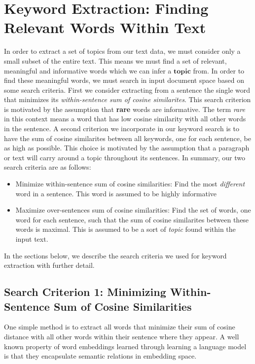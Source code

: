 \documentclass[12pt]{article}
\begin{document}
\section{Keyword Extraction: Finding Relevant Words Within Text}
In order to extract a set of topics from our text data, we must consider only a small subset of the entire text. This means we must find a set of relevant, meaningful and informative words which we can infer a $\textbf{topic}$ from. In order to find these meaningful words, we must search in input document space based on some search criteria. 
First we consider extracting from a sentence the single word that minimizes its \textit{within-sentence sum of cosine similarites}. This search criterion is motivated by the assumption that \textbf{rare} words are informative. The term \textit{rare} in this context means a word that has low cosine similarity with all other words in the sentence. A second criterion we incorporate in our keyword search is to have the sum of cosine similarites between all keywords, one for each sentence, be as high as possible. This choice is motivated by the assumption that a paragraph or text will carry around a topic throughout its sentences. In summary, our two search criteria are as follows:

\begin{itemize}
  \item Minimize within-sentence sum of cosine similarities: Find the most \textit{different} word in a sentence. This word is assumed to be highly informative
  \item Maximize over-sentences sum of cosine similarities: Find the set of words, one word for each sentence, such that the sum of cosine similarites between these words is maximal. This is assumed to be a sort of \textit{topic} found within the input text.
\end{itemize}
In the sections below, we describe the search criteria we used for keyword extraction with further detail.

\subsection{Search Criterion 1: Minimizing Within-Sentence Sum of Cosine Similarities}
One simple method is to extract all words that minimize their sum of cosine distance with all other words within their sentence where they appear. A well known property of word embeddings learned through learning a language model is that they encapsulate semantic relations in embedding space. \\
\end{document}
